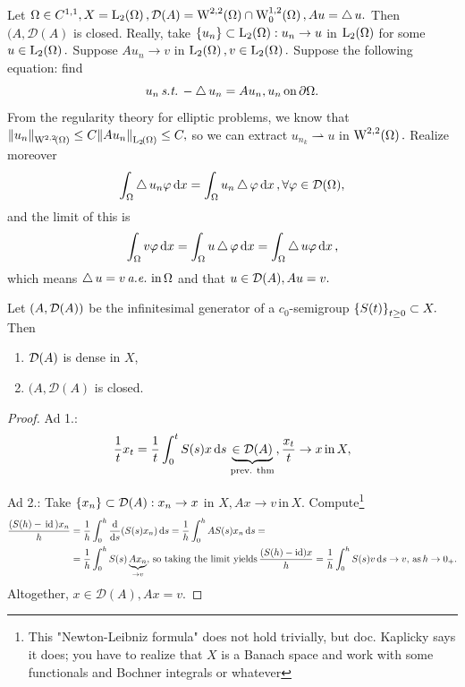 \documentclass{article}
\begin{document}
\begin{example}
	Let $ \Omega \in C^{1,1}, X = \LpSet[2]{\Omega}, \mathcal{D}\qty(A) = \WkpSet[2][2]{\Omega} \cap \WkpzeroSet[1][2]{\Omega}, Au = \laplace u.$ Then $(A, \mathcal{D}(A)$ is closed. Really, take $\qty{u_n} \subset \LpSet[2]{\Omega}: u_n \to u$ in $\LpSet[2]{\Omega}$ for some $u \in \LpSet[2]{\Omega}.$ Suppose $Au_n \to v$ in $\LpSet[2]{\Omega}, v \in \LpSet[2]{\Omega}.$ 
	Suppose the following equation: find
	\[
		u_n \, \text{\textit{s.t.}} \, -\operatorname{\bigtriangleup} u_n = Au_n, u_n \, \text{on} \, \partial \Omega.
	\]
	From the regularity theory for elliptic problems, we know that $\norm{u_n}_{\WkpSet[2][2]{\Omega}} \leq C \norm{Au_n}_{\LpSet[2]{\Omega}} \leq C,$ so we can extract $u_{n_k} \rightharpoonup u$ in $\WkpSet[2][2]{\Omega}.$ Realize moreover
	\[
		\int_{\Omega}\operatorname{\bigtriangleup} u_n \varphi \dd{x} = \int_{\Omega}u_n \operatorname{\bigtriangleup} \varphi\dd{x}, \forall \varphi \in \mathcal{D}\qty(\Omega),
	\]
	and the limit of this is
	\[
		\int_{\Omega}v \varphi\dd{x} = \int_{\Omega}u \operatorname{\bigtriangleup} \varphi\dd{x} = \int_{\Omega} \operatorname{\bigtriangleup} u \varphi\dd{x},
	\]
	which means $\operatorname{\bigtriangleup} u = v \, \text{\textit{a.e.}} \, \, \text{in} \, \Omega$ and that $u \in \mathcal{D}\qty(A), Au = v.$
\end{example}

\begin{theorem}
	Let $\qty(A, \mathcal{D}\qty(A))$ be the infinitesimal generator of a $c_0$-semigroup $\qty{S(t)}_{t\geq 0} \subset X.$ Then

	\begin{enumerate}
		\item $\mathcal{D}\qty(A)$ is dense in $X$,
		\item $(A, \mathcal{D}(A)$ is closed.
	\end{enumerate}
\end{theorem}

\begin{proof}
	Ad 1.:
	\[
	\frac{1}{t}x_t = \frac{1}{t}\int_0^t S(s)x \dd{s} \underbrace{\in \mathcal{D}\qty(A)}_{\, \text{prev. thm} \,}, \frac{x_t}{t}\to x \, \text{in} \,X,
	\]

	Ad 2.:
	Take $\qty{x_n} \subset \mathcal{D}(A): x_n \to x$ in $X, Ax \to v \, \text{in} \,X.$ Compute\footnote{This "Newton-Leibniz formula" does not hold trivially, but doc. Kaplicky says it does; you have to realize that $X$ is a Banach space and work with some functionals and Bochner integrals or whatever}
	\begin{align*}
		\frac{\qty(S(h)-\, \text{id} \,)x_n}{h} &= \frac{1}{h}\int_0^h \dv{s}\qty(S(s)x_n)\dd{s} = \frac{1}{h}\int_0^h AS(s)x_n \dd{s} =\\
		&=\frac{1}{h}\int_0^h S(s)\underbrace{Ax_n}_{\to v}, \, \text{so taking the limit yields} \, \frac{\qty(S(h)-\text{id})x}{h} =\frac{1}{h}\int_0^h S(s)v \dd{s} \to v, \, \text{as} \, h \to 0_+.
	\end{align*}
	Altogether, $x \in \mathcal{D}(A), Ax = v.$	
\end{proof}
\end{document}
